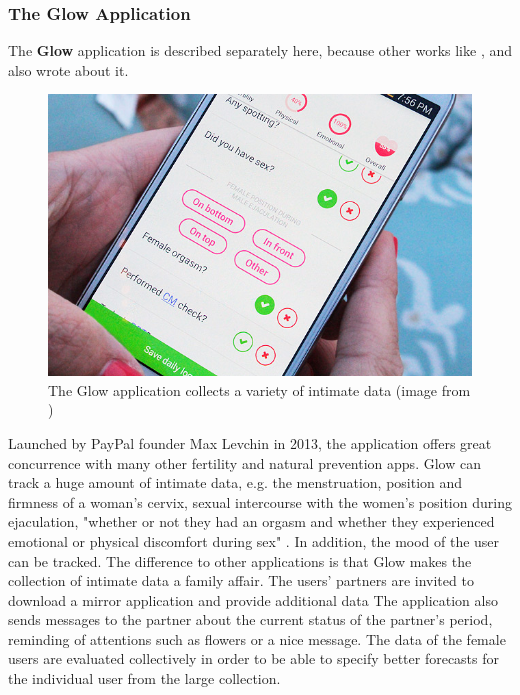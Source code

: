 \subsubsection{The Glow Application}
\label{subsubsec:glow_application}
The \textbf{Glow} application is described separately here, because other works like  \cite{doi:10.1080/15265161.2017.1409823}, \cite{levy2014intimate} and \cite{doi:10.1080/13691058.2014.920528} also wrote about it.
\begin{figure}[htb]
	\centering
	\includegraphics[width=\linewidth]{img/Glow-App-review-screenshot-1.jpg}
	\caption{The Glow application collects a variety of intimate data (image from \cite{glowApp})}
	\label{fig:glow_app}
\end{figure}
Launched by PayPal founder Max Levchin in 2013, the application offers great concurrence with many other fertility and natural prevention apps. Glow can track a huge amount of intimate data, e.g. the menstruation, position and firmness of a woman's cervix, sexual intercourse with the women's position during ejaculation, "whether or not they had an orgasm and whether they experienced emotional or physical discomfort during sex" \cite{doi:10.1080/13691058.2014.920528}. In addition, the mood of the user can be tracked.
The difference to other applications is that Glow makes the collection of intimate data a family affair. The users' partners are invited to download a mirror application and provide additional data \cite{levy2014intimate} The application also sends messages to the partner about the current status of the partner's period, reminding of attentions such as flowers or a nice message.
The data of the female users are evaluated collectively in order to be able to specify better forecasts for the individual user from the large collection.

